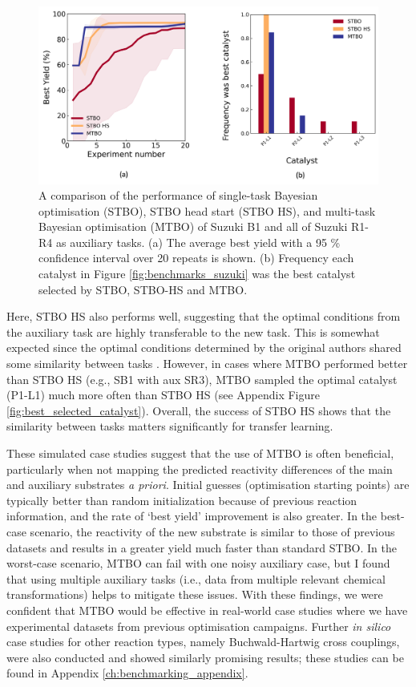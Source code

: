 \begin{figure}
    \includegraphics[width=\textwidth]{gfx/Chapter04/catalyst_optimization.png}

    \caption{A comparison of the performance of single-task Bayesian optimisation (STBO), STBO head start (STBO HS), and multi-task Bayesian optimisation (MTBO) of Suzuki B1 and all of Suzuki R1-R4 as auxiliary tasks. (a)  The average best yield with a 95 \% confidence interval over 20 repeats is shown.  (b) Frequency each catalyst in Figure \ref{fig:benchmarks_suzuki} was the best catalyst selected by STBO, STBO-HS and MTBO.}
    \label{fig:baumgartner_suzuki_reizman_suzuki_all_cotraining_optimisation}
\end{figure}

Here, STBO HS also performs well, suggesting that the optimal conditions from the auxiliary task are highly transferable to the new task. This is somewhat expected since the optimal conditions determined by the original authors shared some similarity between tasks \cite{Reizman2016b, Baumann2019}. However, in cases where MTBO performed better than STBO HS (e.g., SB1 with aux SR3), MTBO sampled the optimal catalyst (P1-L1) much more often than STBO HS (see Appendix Figure  \ref{fig:best_selected_catalyst}). Overall, the success of STBO HS shows that the similarity between tasks matters significantly for transfer learning.

These simulated case studies suggest that the use of MTBO is often beneficial, particularly when not mapping the predicted reactivity differences of the main and auxiliary substrates \textit{a priori}. Initial guesses (optimisation starting points) are typically better than random initialization because of previous reaction information, and the rate of `best yield' improvement is also greater. In the best-case scenario, the reactivity of the new substrate is similar to those of previous datasets and results in a greater yield much faster than standard STBO. In the worst-case scenario, MTBO can fail with one noisy auxiliary case, but I found that using multiple auxiliary tasks (i.e., data from multiple relevant chemical transformations) helps to mitigate these issues.  With these findings, we were confident that MTBO would be effective in real-world case studies where we have experimental datasets from previous optimisation campaigns. Further \textit{in silico} case studies for other reaction types, namely Buchwald-Hartwig cross couplings, were also conducted and showed similarly promising results; these studies can be found in Appendix \ref{ch:benchmarking_appendix}.

